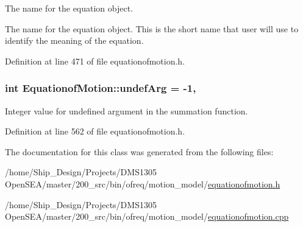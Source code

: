 The name for the equation object. 

The name for the equation object. This is the short name that user will use to identify the meaning of the equation. 

Definition at line 471 of file equationofmotion.\-h.

\hypertarget{classosea_1_1ofreq_1_1_equationof_motion_ad00063eabf1b5075b04c6d2507acebd4}{
\subsubsection[{undef\-Arg}]{\setlength{\rightskip}{0pt plus 5cm}int Equationof\-Motion\-::undef\-Arg = -\/1\hspace{0.3cm}{\ttfamily [static]}, {\ttfamily [protected]}}}\label{classosea_1_1ofreq_1_1_equationof_motion_ad00063eabf1b5075b04c6d2507acebd4}
Integer value for undefined argument in the summation function. 

Definition at line 562 of file equationofmotion.\-h.



The documentation for this class was generated from the following files\-:\begin{DoxyCompactItemize}
\item 
/home/\-Ship\-\_\-\-Design/\-Projects/\-D\-M\-S1305 Open\-S\-E\-A/master/200\-\_\-src/bin/ofreq/motion\-\_\-model/\hyperlink{equationofmotion_8h}{equationofmotion.\-h}\item 
/home/\-Ship\-\_\-\-Design/\-Projects/\-D\-M\-S1305 Open\-S\-E\-A/master/200\-\_\-src/bin/ofreq/motion\-\_\-model/\hyperlink{equationofmotion_8cpp}{equationofmotion.\-cpp}\end{DoxyCompactItemize}
